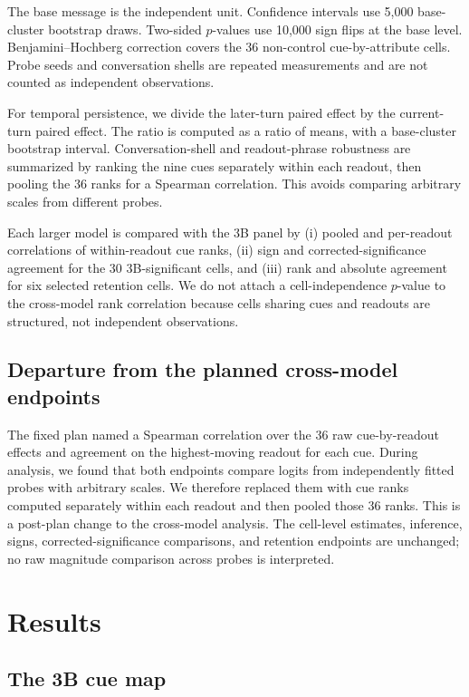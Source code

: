 \documentclass[11pt]{article}
\begin{document}
The base message is the independent unit. Confidence intervals use 5,000
base-cluster bootstrap draws. Two-sided $p$-values use 10,000 sign flips at the
base level. Benjamini--Hochberg correction covers the 36 non-control
cue-by-attribute cells. Probe seeds and conversation shells are repeated
measurements and are not counted as independent observations.

For temporal persistence, we divide the later-turn paired effect by the
current-turn paired effect. The ratio is computed as a ratio of means, with a
base-cluster bootstrap interval. Conversation-shell and readout-phrase
robustness are summarized by ranking the nine cues separately within each
readout, then pooling the 36 ranks for a Spearman correlation. This avoids
comparing arbitrary scales from different probes.

Each larger model is compared with the 3B panel by (i) pooled and per-readout
correlations of within-readout cue ranks, (ii) sign and corrected-significance
agreement for the 30 3B-significant cells, and (iii) rank and absolute
agreement for six selected retention cells. We do not attach a
cell-independence $p$-value to the cross-model rank correlation because cells
sharing cues and readouts are structured, not independent observations.

\subsection{Departure from the planned cross-model endpoints}

The fixed plan named a Spearman correlation over the 36 raw cue-by-readout
effects and agreement on the highest-moving readout for each cue. During
analysis, we found that both endpoints compare logits from independently fitted
probes with arbitrary scales. We therefore replaced them with cue ranks
computed separately within each readout and then pooled those 36 ranks. This is
a post-plan change to the cross-model analysis. The cell-level estimates,
inference, signs, corrected-significance comparisons, and retention endpoints
are unchanged; no raw magnitude comparison across probes is interpreted.

\section{Results}
\label{sec:results}

\subsection{The 3B cue map}
\end{document}
